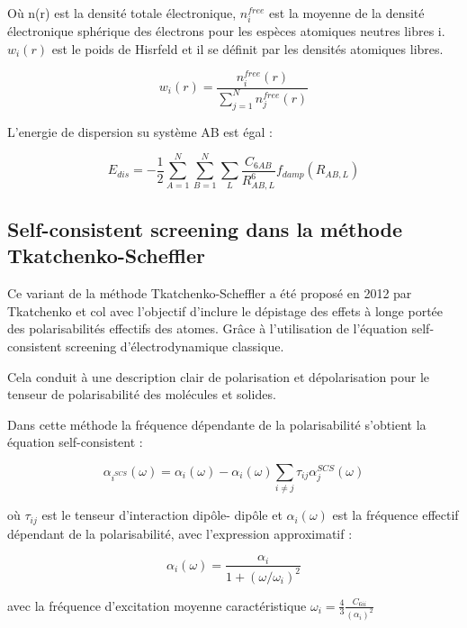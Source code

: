 	Où n(r) est la densité totale électronique, $n_{i}^{free}$ est la moyenne de la densité électronique sphérique des électrons pour les espèces atomiques neutres libres i. $w_{i}(r)$ est le poids de Hisrfeld et il se définit par les densités atomiques libres.
	
	\begin{equation}
	w_{i}(r)= \frac{n_{i}^{free}(r)}{\sum_{j=1}^{N} n_{j}^{free}(r)}
	\end{equation}
	\bigskip
	
	L'energie de dispersion su système AB est égal : 
	
	\begin{equation}
	E_{dis}= -\frac{1}{2} \sum_{A=1}^{N} \sum_{B=1}^{N} \sum_{L} \frac{C_{6AB}}{R^{6}_{AB,L}} f_{damp}(R_{AB,L})
	\end{equation}
	\bigskip
	
	\subsection{Self-consistent screening dans la méthode Tkatchenko-Scheffler}
	
	Ce variant de la méthode Tkatchenko-Scheffler a été proposé en 2012 par Tkatchenko et col\cite{tkatchenko2012accurate} avec l'objectif d'inclure le dépistage des effets à longe portée des polarisabilités effectifs des atomes. Grâce à l'utilisation de l'équation self-consistent screening d'électrodynamique classique. 
	
	Cela conduit à une description clair de polarisation et dépolarisation pour le tenseur de polarisabilité des molécules et solides. 
	
	Dans cette méthode la fréquence dépendante de la polarisabilité s'obtient la équation self-consistent :
	
	\begin{equation}
	\alpha_{i^{SCS}}(\omega) = \alpha_{i}(\omega) - \alpha_{i}(\omega) \sum_{i\neq j} \tau_{ij} \alpha_{j}^{SCS}(\omega)
	\end{equation} 
	
	où $\tau_{ij}$ est le tenseur d'interaction dipôle- dipôle et $\alpha_{i}(\omega)$ est la fréquence effectif dépendant de la polarisabilité, avec l'expression approximatif : 
	
	\begin{equation}
	\alpha_{i} (\omega) = \frac{\alpha_{i}}{1 + (\omega/\omega_{i})^{2}}
	\end{equation}
	
	avec la fréquence d'excitation moyenne caractéristique $\omega_{i} = \frac{4}{3} \frac{C_{6ii}}{(\alpha_{i})^{2}}$
	\bigskip
	
